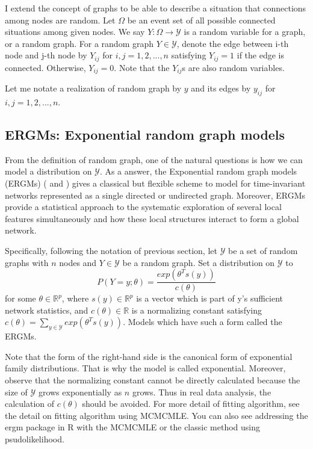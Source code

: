 \documentclass[aspectratio=169,ignorenonframetext,9pt]{beamer}
\theoremstyle{plain}
\theoremstyle{definition}
\begin{document}
I extend the concept of graphs to be able to describe a situation that connections among nodes are random.
Let $\Omega$ be an event set of all possible connected situations among given nodes.
We say $Y: \Omega \to \mathcal{Y}$ is a random variable for a graph, or a random graph.
For a random graph $Y \in \mathcal{Y}$, denote the edge between i-th node and j-th node by $Y_{ij}$ for $i,j=1,2,...,n$
satisfying $Y_{ij}=1$ if the edge is connected. Otherwise, $Y_{ij}=0$.
Note that the $Y_{ij}$s are also random variables.

Let me notate a realization of random graph by $y$ and its edges by $y_{ij}$ for $i,j=1,2,...,n$.


\subsection{ERGMs: Exponential random graph models}
From the definition of random graph, one of the natural questions is 
how we can model a distribution on $\mathcal{Y}$.
As a answer, the Exponential random graph models (ERGMs) (\cite{RN123} and \cite{RN122})
gives a classical but 
flexible scheme to model for time-invariant networks represented as a single directed or undirected graph.
Moreover, ERGMs provide a statistical approach to the systematic exploration of several local features simultaneously and 
how these local structures interact to form a global network.

Specifically, following the notation of previous section,
let $\mathcal{Y}$ be a set of random graphs with $n$ nodes and $Y \in \mathcal{Y}$ be a random graph.
Set a distribution on $\mathcal{Y}$ to
    \[P(Y=y;\theta) = \frac{exp(\theta^{T}s(y))}{c(\theta)}\]
for some $\theta\in\mathbb{R}^p$,
where $s(y)\in\mathbb{R}^p$ is a vector which is part of y's sufficient network statistics,
and $c(\theta)\in\mathbb{R}$ is a normalizing constant satisfying $c(\theta)=\sum_{y\in\mathcal{Y}}exp(\theta^{T}s(y))$.
Models which have such a form called the ERGMs.

Note that the form of the right-hand side is the canonical form of exponential family distributions.
That is why the model is called exponential. Moreover, observe that the normalizing constant cannot be directly calculated
because the size of $\mathcal{Y}$ grows exponentially as $n$ grows.
Thus in real data analysis, the calculation of $c(\theta)$ should be avoided.
For more detail of fitting algorithm, see \cite{RN104} the detail on fitting algorithm using MCMCMLE.
You can also see \cite{RN100} addressing the ergm package in R with the MCMCMLE or the classic method using psudolikelihood.
\end{document}
